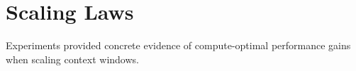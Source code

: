 \section{Scaling Laws}
Experiments provided concrete evidence of compute-optimal performance gains when scaling context windows.
